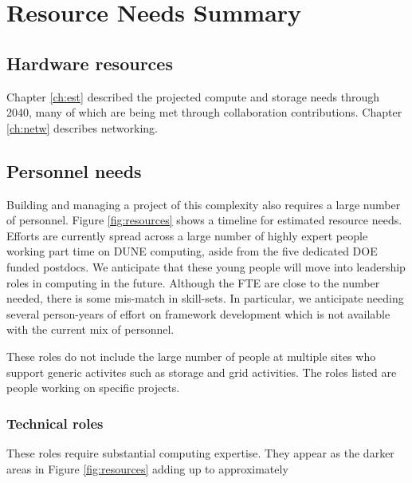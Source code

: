 \documentclass[../main-v1.tex]{subfiles}
\begin{document}
\chapter{Resource Needs Summary}
\label{ch:resource}

\section{Hardware resources}
Chapter \ref{ch:est} described the projected compute and storage needs through 2040, many of which are being met through collaboration contributions. Chapter \ref{ch:netw} describes networking. 



\section{Personnel needs}
Building and managing a project of this complexity also requires a large number of personnel.  Figure \ref{fig:resources} shows a timeline for estimated resource needs.   Efforts are currently spread across a large number of highly expert people working part time on DUNE computing, aside from the five dedicated DOE funded postdocs.  We anticipate that these young people will move into leadership roles in computing in the future.  Although the  FTE are close to the number needed, there is some mis-match in skill-sets. In particular, we anticipate needing several person-years of effort on framework development which is not available with the current mix of personnel.

These roles do not include the large number of people at multiple sites who support generic activites such as storage and grid activities.  The roles listed are people working on  specific projects. 

\subsection{Technical roles}

These roles require substantial computing expertise.  They appear as the darker areas in Figure \ref{fig:resources} adding up to approximately 
\end{document}
